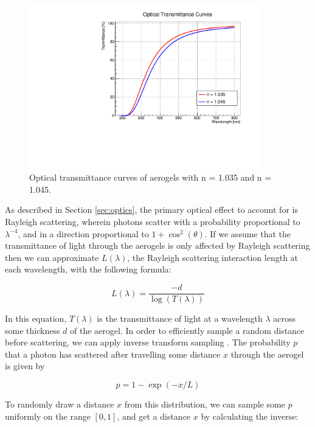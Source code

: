 \begin{figure}[]
  \centering
  \includegraphics[width=0.9\textwidth]{./figs/transmittance.pdf}
    \caption{Optical transmittance curves of aerogels with n = 1.035 and n = 1.045.}
  \label{fig:transmittance}
\end{figure}

As described in Section \ref{sec:optics}, the primary optical effect to account for is Rayleigh scattering, wherein photons scatter with a probability proportional to $\lambda^{-4}$, and in a direction proportional to $1 + \cos^2(\theta)$.
If we assume that the transmittance of light through the aerogels is only affected by Rayleigh scattering then we can approximate $L(\lambda)$, the Rayleigh scattering interaction length at each wavelength, with the following formula:

\begin{equation}
L(\lambda) = \frac{-d}{\log(T(\lambda))}
    \label{eq:scatLength}
\end{equation}

In this equation, $T(\lambda)$ is the transmittance of light at a wavelength $\lambda$ across some thickness $d$ of the aerogel.
In order to efficiently sample a random distance before scattering, we can apply inverse transform sampling \cite{randomvar}.
The probability $p$ that a photon has scattered after travelling some distance $x$ through the aerogel is given by

\begin{equation}
p = 1 - \exp(-x/L)
    \label{eq:scatProb}
\end{equation}

To randomly draw a distance $x$ from this distribution, we can sample some $p$ uniformly on the range $[0,1]$, and get a distance $x$ by calculating the inverse:

